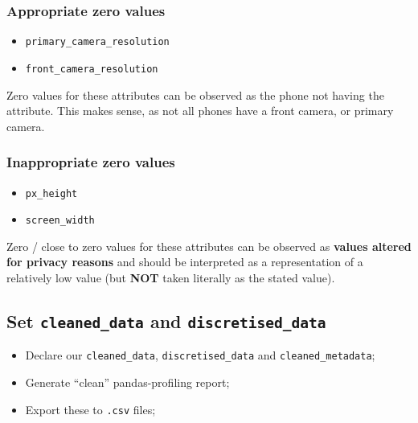 \documentclass[11pt]{article}
\providecommand{\tightlist}{%
      \setlength{\itemsep}{0pt}\setlength{\parskip}{0pt}}
\begin{document}
\hypertarget{appropriate-zero-values}{%
\subsubsection{\texorpdfstring{\textbf{Appropriate zero
values}}{Appropriate zero values}}\label{appropriate-zero-values}}

\begin{itemize}
\tightlist
\item
  \texttt{primary\_camera\_resolution}
\item
  \texttt{front\_camera\_resolution}
\end{itemize}

Zero values for these attributes can be observed as the phone not having
the attribute. This makes sense, as not all phones have a front camera,
or primary camera.

\hypertarget{inappropriate-zero-values}{%
\subsubsection{Inappropriate zero
values}\label{inappropriate-zero-values}}

\begin{itemize}
\tightlist
\item
  \texttt{px\_height}
\item
  \texttt{screen\_width}
\end{itemize}

Zero / close to zero values for these attributes can be observed as
\textbf{values altered for privacy reasons} and should be interpreted as
a representation of a relatively low value (but \textbf{NOT} taken
literally as the stated value).

    \hypertarget{set-cleaned_data-and-discretised_data}{%
\subsection{\texorpdfstring{Set \texttt{cleaned\_data} and
\texttt{discretised\_data}}{Set cleaned\_data and discretised\_data}}\label{set-cleaned_data-and-discretised_data}}

\begin{itemize}
\tightlist
\item
  Declare our \texttt{cleaned\_data}, \texttt{discretised\_data} and
  \texttt{cleaned\_metadata};
\item
  Generate ``clean'' pandas-profiling report;
\item
  Export these to \texttt{.csv} files;
\end{itemize}
\end{document}
